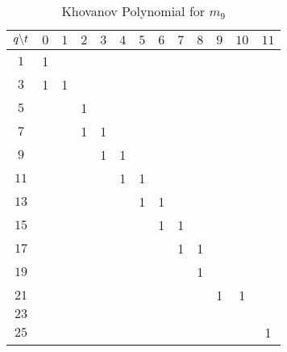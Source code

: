 \documentclass{article}
\theoremstyle{plain}
\begin{document}
        \begin{table}[H]
            \centering
            \begin{tabular}{| c | c | c | c | c | c | c | c | c | c | c | c | c |}
                \hline
                $q\symbol{92}t$&$0$&$1$&$2$&$3$&$4$&$5$&$6$&$7$&$8$&$9$&$10$&$11$\\
                \hline
                $1$&1&&&&&&&&&&&\\
                \hline
                $3$&1&1&&&&&&&&&&\\
                \hline
                $5$&&&1&&&&&&&&&\\
                \hline
                $7$&&&1&1&&&&&&&&\\
                \hline
                $9$&&&&1&1&&&&&&&\\
                \hline
                $11$&&&&&1&1&&&&&&\\
                \hline
                $13$&&&&&&1&1&&&&&\\
                \hline
                $15$&&&&&&&1&1&&&&\\
                \hline
                $17$&&&&&&&&1&1&&&\\
                \hline
                $19$&&&&&&&&&1&&&\\
                \hline
                $21$&&&&&&&&&&1&1&\\
                \hline
                $23$&&&&&&&&&&&&\\
                \hline
                $25$&&&&&&&&&&&&1\\
                \hline
            \end{tabular}
            \caption{Khovanov Polynomial for $m_{9}$}
            \label{table:m_9_kho}
        \end{table}
\end{document}
